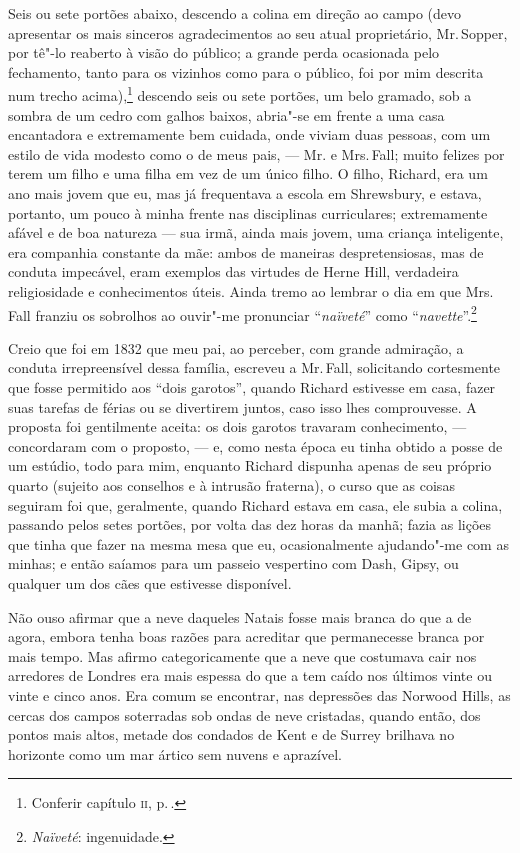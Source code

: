 Seis ou sete portões abaixo, descendo a colina em direção ao campo (devo
apresentar os mais sinceros agradecimentos ao seu atual proprietário, Mr.\,Sopper, por tê"-lo reaberto à visão do público; a grande perda ocasionada
pelo fechamento, tanto para os vizinhos como para o público, foi por mim
descrita num trecho acima),\footnote{Conferir capítulo \textsc{ii}, p.\,\pageref{herne}.} descendo seis ou sete portões, um belo gramado, sob a sombra
de um cedro com galhos baixos, abria"-se em frente a uma casa encantadora
e extremamente bem cuidada, onde viviam duas pessoas, com um estilo de
vida modesto como o de meus pais, --- Mr. e Mrs.\,Fall; muito felizes por
terem um filho e uma filha em vez de um único filho. O filho, Richard,
era um ano mais jovem que eu, mas já frequentava a escola em Shrewsbury,
e estava, portanto, um pouco à minha frente nas disciplinas
curriculares; extremamente afável e de boa natureza --- sua irmã, ainda
mais jovem, uma criança inteligente, era companhia constante da mãe:
ambos de maneiras despretensiosas, mas de conduta impecável, eram
exemplos das virtudes de Herne Hill, verdadeira religiosidade e
conhecimentos úteis. Ainda tremo ao lembrar o dia em que Mrs.\,Fall
franziu os sobrolhos ao ouvir"-me pronunciar ``\textit{naïveté}'' como
``\textit{navette}''.\footnote{\textit{Naïveté}: ingenuidade.}

Creio que foi em 1832 que meu pai, ao perceber, com grande
admiração, a conduta irrepreensível dessa família, escreveu a Mr.\,Fall,
solicitando cortesmente que fosse permitido aos ``dois garotos'', quando
Richard estivesse em casa, fazer suas tarefas de férias ou se divertirem
juntos, caso isso lhes comprouvesse. A proposta foi gentilmente aceita:
os dois garotos travaram conhecimento, --- concordaram com o proposto, ---
e, como nesta época eu tinha obtido a posse de um estúdio, todo para
mim, enquanto Richard dispunha apenas de seu próprio quarto (sujeito aos
conselhos e à intrusão fraterna), o curso que as coisas seguiram foi
que, geralmente, quando Richard estava em casa, ele subia a colina,
passando pelos setes portões, por volta das dez horas da manhã; fazia as
lições que tinha que fazer na mesma mesa que eu, ocasionalmente
ajudando"-me com as minhas; e então saíamos para um passeio vespertino
com Dash, Gipsy, ou qualquer um dos cães que estivesse disponível.

Não ouso afirmar que a neve daqueles Natais fosse mais branca do
que a de agora, embora tenha boas razões para acreditar que permanecesse
branca por mais tempo. Mas afirmo categoricamente que a neve que
costumava cair nos arredores de Londres era mais espessa do que a tem
caído nos últimos vinte ou vinte e cinco anos. Era comum se encontrar,
nas depressões das Norwood Hills, as cercas dos campos soterradas sob
ondas de neve cristadas, quando então, dos pontos mais altos, metade dos
condados de Kent e de Surrey brilhava no horizonte como um mar ártico
sem nuvens e aprazível.

